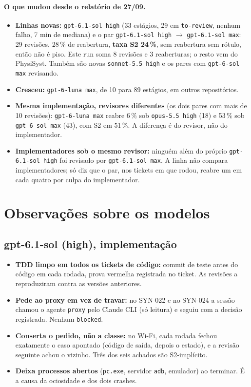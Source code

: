 \documentclass[11pt,a4paper]{article}
\begin{document}
\paragraph{O que mudou desde o relatório de 27/09.}
\begin{itemize}
  \item \textbf{Linhas novas:} \texttt{gpt-6.1-sol high} (33 estágios, 29 em
        \texttt{to-review}, nenhum falho, 7 min de mediana) e o par
        \texttt{gpt-6.1-sol high} $\to$ \texttt{gpt-6.1-sol max}: 29 revisões,
        28\,\% de reabertura, \textbf{taxa S2 24\,\%}, sem reabertura sem
        rótulo, então não é piso. Este run soma 8 revisões e 3 reaberturas; o
        resto vem do PhysiSyst. Também são novas \texttt{sonnet-5.5 high} e os
        pares com \texttt{gpt-6-sol max} revisando.
  \item \textbf{Cresceu:} \texttt{gpt-6-luna max}, de 10 para 89 estágios, em
        outros repositórios.
  \item \textbf{Mesma implementação, revisores diferentes} (os dois pares com
        mais de 10 revisões): \texttt{gpt-6-luna max} reabre 6\,\% sob
        \texttt{opus-5.5 high} (18) e 53\,\% sob \texttt{gpt-6-sol max} (43),
        com S2 em 51\,\%. A diferença é do revisor, não do implementador.
  \item \textbf{Implementadores sob o mesmo revisor:} ninguém além do próprio
        \texttt{gpt-6.1-sol high} foi revisado por \texttt{gpt-6.1-sol max}.
        A linha não compara implementadores; só diz que o par, nos tickets em
        que rodou, reabre um em cada quatro por culpa do implementador.
\end{itemize}

\section{Observações sobre os modelos}

\subsection*{gpt-6.1-sol (high), implementação}
\begin{itemize}
  \item \textbf{TDD limpo em todos os tickets de código:} commit de teste antes
        do código em cada rodada, prova vermelha registrada no ticket. As
        revisões a reproduziram contra as versões anteriores.
  \item \textbf{Pede ao proxy em vez de travar:} no SYN-022 e no SYN-024 a
        sessão chamou o agente \texttt{proxy} pelo Claude CLI (só leitura) e
        seguiu com a decisão registrada. Nenhum \texttt{blocked}.
  \item \textbf{Conserta o pedido, não a classe:} no Wi-Fi, cada rodada fechou
        exatamente o caso apontado (código de saída, depois o estado), e a
        revisão seguinte achou o vizinho. Três dos seis achados são
        S2-implícito.
  \item \textbf{Deixa processos abertos} (\texttt{pc.exe}, servidor
        \texttt{adb}, emulador) ao terminar. É a causa da ociosidade e dos dois
        crashes.
\end{itemize}
\end{document}
